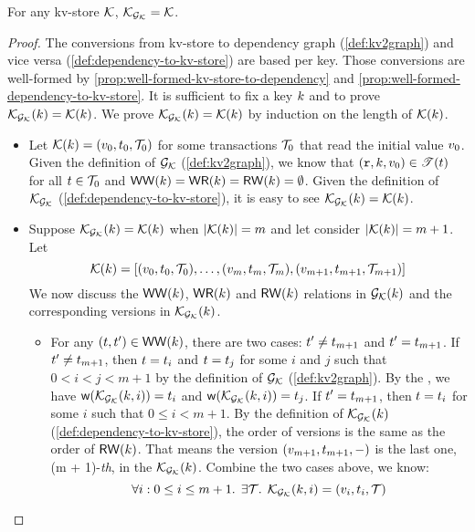 \begin{proposition}
    \label{prop:bijection:mkvs-dgraph}
For any kv-store $\mathcal{K}$, $\mathcal{K}_{\mathcal{G}_{\mathcal{K}}} = \mathcal{K}$.
\end{proposition}
\begin{proof}
The conversions from kv-store to dependency graph (\cref{def:kv2graph}) and vice versa (\cref{def:dependency-to-kv-store}) are based per key.
Those conversions are well-formed by \cref{prop:well-formed-kv-store-to-dependency} and \cref{prop:well-formed-dependency-to-kv-store}.
It is sufficient to fix a key \( k \) and to prove \( \mathcal{K}_{\mathcal{G}_{\mathcal{K}}}(k) = \mathcal{K}(k) \).
We prove \( \mathcal{K}_{\mathcal{G}_{\mathcal{K}}}(k) = \mathcal{K}(k) \) by induction on the length of \( \mathcal{K}(k) \).

\begin{itemize}
    \item {}
Let \( \mathcal{K}(k) = (v_0, t_0, \mathcal{T}_0 ) \) for some transactions \( \mathcal{T}_0 \) that read the initial value \( v_0 \).
Given the definition of \( \mathcal{G}_{\mathcal{K}} \) (\cref{def:kv2graph}), we know that \( (\textnormal{\texttt r}, k, v_0 ) \in \mathscr{T}(t) \) for all \( t \in \mathcal{T}_0 \) and \( \mathsf{WW}(k) = \mathsf{WR}(k) = \mathsf{RW}(k) = \emptyset  \).
Given the definition of \( \mathcal{K}_{\mathcal{G}_{\mathcal{K}}}\) (\cref{def:dependency-to-kv-store}), it is easy to see \( \mathcal{K}_{\mathcal{G}_{\mathcal{K}}}(k) = \mathcal{K}(k) \).

    \item {}
Suppose \( \mathcal{K}_{\mathcal{G}_{\mathcal{K}}}(k) = \mathcal{K}(k) \) when \( |\mathcal{K}(k)| = m \) and let consider  \( |\mathcal{K}(k)| = m + 1 \).
Let 
\[
    \mathcal{K}(k) = \left[ (v_0, t_0, \mathcal{T}_0 ), \dots, (v_m, t_m, \mathcal{T}_m ), (v_{m+1}, t_{m+1}, \mathcal{T}_{m+1} )  \right] 
\]
We now discuss the \( \mathsf{WW}(k) \), \( \mathsf{WR}(k) \) and \( \mathsf{RW}(k) \) relations in \( \mathcal{G}_{\mathcal{K}}(k) \) and the corresponding versions in \( \mathcal{K}_{\mathcal{G}_{\mathcal{K}}}(k) \).
\begin{itemize}
    \item For any \( (t, t') \in \mathsf{WW}(k) \), there are two cases: \( t' \neq t_{m+1} \) and \( t' = t_{m+1} \).
    If \( t' \neq t_{m+1} \), then \( t = t_i \) and \( t = t_j \) for some \( i \) and \( j \) such that \( 0 < i < j < m + 1 \) by the definition of \( \mathcal{G}_{\mathcal{K}} \) (\cref{def:kv2graph}).
    By the \ih, we have \( \WTx(\mkvs_{\Gr_\mkvs}(\key,i))  = \txid_i \) and \( \WTx(\mkvs_{\Gr_\mkvs}(\key,i))  = \txid_j \).
    If \( t' = t_{m + 1} \), then \( t = t_i \) for some \( i \) such that \( 0 \leq i < m + 1 \).
    By the definition of  \( \mathcal{K}_{\mathcal{G}_{\mathcal{K}}}(k) \) (\cref{def:dependency-to-kv-store}), the order of versions is the same as the order of \( \mathsf{RW}(k) \).
    That means the version \( (v_{m+1}, t_{m+1}, - ) \) is the last one, \ie (m + 1)-\emph{th}, in the \( \mathcal{K}_{\mathcal{G}_{\mathcal{K}}}(k) \).
    Combine the two cases above, we know:
    \begin{equation}
        \label{equ:ww-back-to-ww}
        \forall i : 0 \leq i \leq m + 1 \ldotp \; \exists \mathcal{T} \ldotp \; \mathcal{K}_{\mathcal{G}_{\mathcal{K}}}(k, i) = (v_i, t_i, \mathcal{T})
    \end{equation}
    

\end{itemize}
\end{itemize}
\end{proof}
